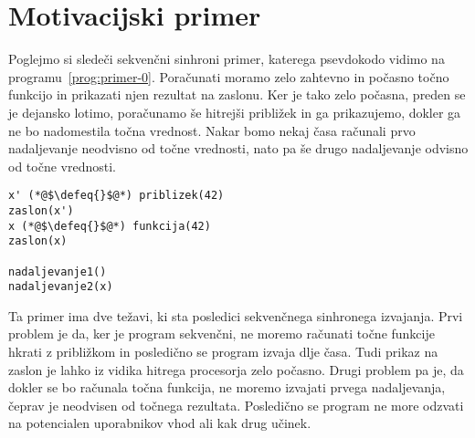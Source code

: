 \section{Motivacijski primer} \label{sec:primeri-aeff}

Poglejmo si sledeči sekvenčni sinhroni primer, katerega psevdokodo vidimo na programu~\ref{prog:primer-0}. Poračunati moramo zelo zahtevno in počasno točno funkcijo in prikazati njen rezultat na zaslonu. Ker je tako zelo počasna, preden se je dejansko lotimo, poračunamo še hitrejši približek in ga prikazujemo, dokler ga ne bo nadomestila točna vrednost. Nakar bomo nekaj časa računali prvo nadaljevanje neodvisno od točne vrednosti, nato pa še drugo nadaljevanje odvisno od točne vrednosti. 

\begin{lstlisting}[caption={Sinhron sekvečni primer.},label={prog:primer-0},float,floatplacement=H]
x' (*@$\defeq{}$@*) priblizek(42)
zaslon(x')
x (*@$\defeq{}$@*) funkcija(42)
zaslon(x)

nadaljevanje1()
nadaljevanje2(x)
\end{lstlisting}

Ta primer ima dve težavi, ki sta posledici sekvenčnega sinhronega izvajanja. Prvi problem je da, ker je program sekvenčni, ne moremo računati točne funkcije hkrati z približkom in posledično se program izvaja dlje časa. Tudi prikaz na zaslon je lahko iz vidika hitrega procesorja zelo počasno. Drugi problem pa je, da dokler se bo računala točna funkcija, ne moremo izvajati prvega nadaljevanja, čeprav je neodvisen od točnega rezultata. Posledično se program ne more odzvati na potencialen uporabnikov vhod ali kak drug učinek.  

